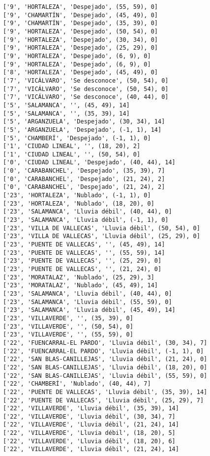 \documentclass[11pt]{article}
\begin{document}
\begin{Verbatim}[commandchars=\\\{\}]
['9', 'HORTALEZA', 'Despejado', (55, 59), 0]
['9', 'CHAMARTÍN', 'Despejado', (45, 49), 0]
['9', 'CHAMARTÍN', 'Despejado', (35, 39), 0]
['9', 'HORTALEZA', 'Despejado', (50, 54), 0]
['9', 'HORTALEZA', 'Despejado', (30, 34), 0]
['9', 'HORTALEZA', 'Despejado', (25, 29), 0]
['9', 'HORTALEZA', 'Despejado', (6, 9), 0]
['9', 'HORTALEZA', 'Despejado', (6, 9), 0]
['8', 'HORTALEZA', 'Despejado', (45, 49), 0]
['7', 'VICÁLVARO', 'Se desconoce', (50, 54), 0]
['7', 'VICÁLVARO', 'Se desconoce', (50, 54), 0]
['7', 'VICÁLVARO', 'Se desconoce', (40, 44), 0]
['5', 'SALAMANCA', '', (45, 49), 14]
['5', 'SALAMANCA', '', (35, 39), 14]
['5', 'ARGANZUELA', 'Despejado', (30, 34), 14]
['5', 'ARGANZUELA', 'Despejado', (-1, 1), 14]
['5', 'CHAMBERÍ', 'Despejado', (-1, 1), 0]
['1', 'CIUDAD LINEAL', '', (18, 20), 2]
['1', 'CIUDAD LINEAL', '', (50, 54), 0]
['0', 'CIUDAD LINEAL', 'Despejado', (40, 44), 14]
['0', 'CARABANCHEL', 'Despejado', (35, 39), 7]
['0', 'CARABANCHEL', 'Despejado', (21, 24), 2]
['0', 'CARABANCHEL', 'Despejado', (21, 24), 2]
['23', 'HORTALEZA', 'Nublado', (-1, 1), 0]
['23', 'HORTALEZA', 'Nublado', (18, 20), 0]
['23', 'SALAMANCA', 'Lluvia débil', (40, 44), 0]
['23', 'SALAMANCA', 'Lluvia débil', (-1, 1), 0]
['23', 'VILLA DE VALLECAS', 'Lluvia débil', (50, 54), 0]
['23', 'VILLA DE VALLECAS', 'Lluvia débil', (25, 29), 0]
['23', 'PUENTE DE VALLECAS', '', (45, 49), 14]
['23', 'PUENTE DE VALLECAS', '', (55, 59), 14]
['23', 'PUENTE DE VALLECAS', '', (25, 29), 0]
['23', 'PUENTE DE VALLECAS', '', (21, 24), 0]
['23', 'MORATALAZ', 'Nublado', (25, 29), 3]
['23', 'MORATALAZ', 'Nublado', (45, 49), 14]
['23', 'SALAMANCA', 'Lluvia débil', (40, 44), 0]
['23', 'SALAMANCA', 'Lluvia débil', (55, 59), 0]
['23', 'SALAMANCA', 'Lluvia débil', (45, 49), 14]
['23', 'VILLAVERDE', '', (35, 39), 0]
['23', 'VILLAVERDE', '', (50, 54), 0]
['23', 'VILLAVERDE', '', (55, 59), 0]
['22', 'FUENCARRAL-EL PARDO', 'Lluvia débil', (30, 34), 7]
['22', 'FUENCARRAL-EL PARDO', 'Lluvia débil', (-1, 1), 0]
['22', 'SAN BLAS-CANILLEJAS', 'Lluvia débil', (21, 24), 0]
['22', 'SAN BLAS-CANILLEJAS', 'Lluvia débil', (18, 20), 0]
['22', 'SAN BLAS-CANILLEJAS', 'Lluvia débil', (55, 59), 0]
['22', 'CHAMBERÍ', 'Nublado', (40, 44), 7]
['22', 'PUENTE DE VALLECAS', 'Lluvia débil', (35, 39), 14]
['22', 'PUENTE DE VALLECAS', 'Lluvia débil', (25, 29), 7]
['22', 'VILLAVERDE', 'Lluvia débil', (35, 39), 14]
['22', 'VILLAVERDE', 'Lluvia débil', (30, 34), 7]
['22', 'VILLAVERDE', 'Lluvia débil', (21, 24), 14]
['22', 'VILLAVERDE', 'Lluvia débil', (18, 20), 5]
['22', 'VILLAVERDE', 'Lluvia débil', (18, 20), 6]
['22', 'VILLAVERDE', 'Lluvia débil', (21, 24), 14]

\end{Verbatim}
\end{document}
